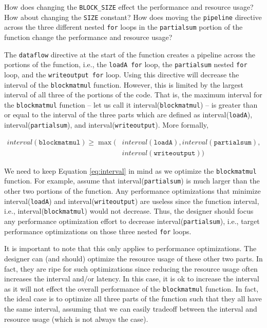 \begin{exercise}
How does changing the \lstinline{BLOCK_SIZE} effect the performance and resource usage? How about changing the \lstinline{SIZE} constant? How does moving the \lstinline{pipeline} directive across the three different nested \lstinline{for} loops in the \lstinline{partialsum} portion of the function change the performance and resource usage?
\end{exercise}

The \lstinline{dataflow} directive at the start of the function creates a pipeline across the portions of the function, i.e., the \lstinline{loadA for} loop, the \lstinline{partialsum} nested \lstinline{for} loop, and the \lstinline{writeoutput for} loop. Using this directive will decrease the interval of the \lstinline{blockmatmul} function. However, this is limited by the largest interval of all three of the portions of the code. That is, the maximum interval for the \lstinline{blockmatmul} function -- let us call it interval(\lstinline{blockmatmul}) -- is greater than or equal to the interval of the three parts which are defined as interval(\lstinline{loadA}), interval(\lstinline{partialsum}), and interval(\lstinline{writeoutput}). More formally, 

\begin{align}
\label{eq:interval}
interval(\texttt{blockmatmul}) \ge \max(&interval(\texttt{loadA}), interval(\texttt{partialsum}), \nonumber \\
 & interval(\texttt{writeoutput}))
 \end{align}

We need to keep Equation \ref{eq:interval} in mind as we optimize the \lstinline{blockmatmul} function. For example, assume that interval(\lstinline{partialsum}) is much larger than the other two portions of the function. Any performance optimizations that minimize interval(\lstinline{loadA}) and interval(\lstinline{writeoutput}) are useless since the function interval, i.e., interval(\lstinline{blockmatmul}) would not decrease. Thus, the designer should focus any performance optimization effort to decrease interval(\lstinline{partialsum}), i.e., target performance optimizations on those three nested \lstinline{for} loops. 

It is important to note that this only applies to performance optimizations. The designer can (and should) optimize the resource usage of these other two parts. In fact, they are ripe for such optimizations since reducing the resource usage often increases the interval and/or latency. In this case, it is ok to increase the interval as it will not effect the overall performance of the \lstinline{blockmatmul} function. In fact, the ideal case is to optimize all three parts of the function such that they all have the same interval, assuming that we can easily tradeoff between the interval and resource usage (which is not always the case). 

